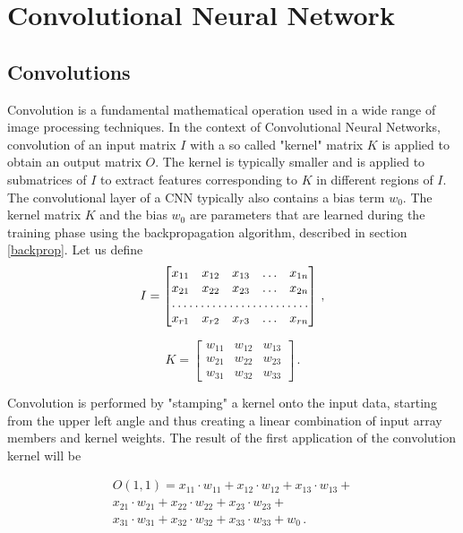 \section{Convolutional Neural Network}
\subsection{Convolutions}

Convolution is a fundamental mathematical operation used in a wide range of image processing techniques. In the context of Convolutional Neural Networks, convolution of an input matrix $I$ with a so called "kernel" matrix $K$ is applied to obtain an output matrix $O$. The kernel is typically smaller and is applied to submatrices of $I$ to extract features corresponding to $K$ in different regions of $I$. The convolutional layer of a \acs{CNN} typically also contains a bias term $w_0$. The kernel matrix $K$ and the bias $w_0$ are parameters that are learned during the training phase using the backpropagation algorithm, described in section \ref{backprop}. Let us define
\begin{equation}
	I = \begin{bmatrix}
    x_{11}       & x_{12} & x_{13} & \dots & x_{1n} \\
    x_{21}       & x_{22} & x_{23} & \dots & x_{2n} \\
    \hdotsfor{5} \\
    x_{r1}       & x_{r2} & x_{r3} & \dots & x_{rn}
\end{bmatrix}\,,
\label{Input data}
\end{equation}

\begin{equation}
	K = \begin{bmatrix}
    w_{11}       & w_{12} & w_{13} \\
    w_{21}       & w_{22} & w_{23} \\
    w_{31}       & w_{32} & w_{33} 
	\end{bmatrix}\,.
\label{Kernel}
\end{equation}

Convolution is performed by "stamping" a kernel onto the input data, starting from the upper left angle and thus creating a linear combination of input array members and kernel weights. The result of the first application of the convolution kernel will be

\begin{equation}
\begin{aligned}
	O(1, 1) = x_{11}\cdot w_{11} + x_{12}\cdot w_{12} + x_{13}\cdot w_{13} +\\
	x_{21}\cdot w_{21} + x_{22}\cdot w_{22} + x_{23}\cdot w_{23} + \\
	x_{31}\cdot w_{31} + x_{32}\cdot w_{32} + x_{33}\cdot w_{33} + w_0\,.
\end{aligned}
\end{equation}

